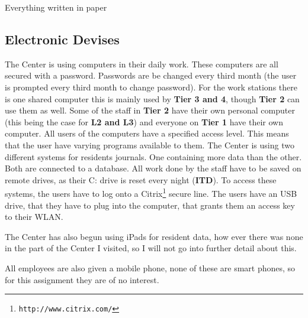 \documentclass[11pt]{article}
\begin{document}
Everything written in paper
\subsection{Electronic Devises}
The Center is using computers in their daily work. These computers are all secured with a password. Passwords are be changed every third month (the user is prompted every third month to change password). For the work stations there is one shared computer this is mainly used by \textbf{Tier 3 and 4}, though \textbf{Tier 2} can use them as well. Some of the staff in \textbf{Tier 2} have their own personal computer (this being the case for \textbf{L2 and L3}) and everyone on \textbf{Tier 1} have their own computer. All users of the computers have a specified access level. This means that the user have varying programs available to them. The Center is using two different systems for residents journals. One containing more data than the other. Both are connected to a database. All work done by the staff have to be saved on remote drives, as their C: drive is reset every night (\textbf{ITD}). To access these systems, the users have to log onto a Citrix\footnote{\texttt{http://www.citrix.com/}} secure line. The users have an USB drive, that they have to plug into the computer, that grants them an access key to their WLAN.

The Center has also begun using iPads for resident data, how ever there was none in the part of the Center I visited, so I will not go into further detail about this.

All employees are also given a mobile phone, none of these are smart phones, so for this assignment they are of no interest.
\end{document}
